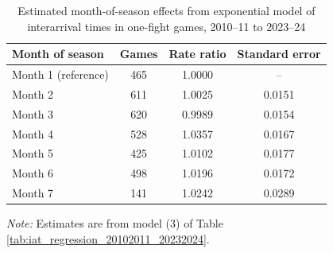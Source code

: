 \begin{table}[!h]
\centering
\caption{Estimated month-of-season effects from exponential model of interarrival times in one-fight games, 2010--11 to 2023--24}
\label{tab:month_effects_20102011_20232024}
\small
\renewcommand{\arraystretch}{1.12}
\setlength{\tabcolsep}{6pt}

\begin{tabular*}{0.75\textwidth}{@{\extracolsep{\fill}}lccc}
\toprule
Month of season & Games & Rate ratio & Standard error \\
\midrule
Month 1 (reference) & 465 & 1.0000 & -- \\
Month 2 & 611 & 1.0025 & 0.0151 \\
Month 3 & 620 & 0.9989 & 0.0154 \\
Month 4 & 528 & 1.0357 & 0.0167 \\
Month 5 & 425 & 1.0102 & 0.0177 \\
Month 6 & 498 & 1.0196 & 0.0172 \\
Month 7 & 141 & 1.0242 & 0.0289 \\
\bottomrule
\end{tabular*}

\vspace{0.4em}
\parbox{0.75\textwidth}{
\footnotesize
\textit{Note:} Estimates are from model (3) of Table \ref{tab:iat_regression_20102011_20232024}.
}
\end{table}
